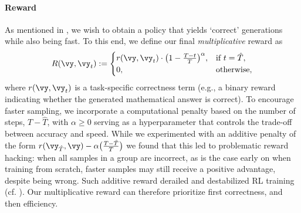 \paragraph{Reward} As mentioned in , we wish to obtain a policy that yields `correct' generations while also being fast. To this end, we define our final \emph{multiplicative} reward as
\begin{align}
\label{eq:reward}
        R(\vy, \vy_t) := \begin{cases}
        r(\vy, \vy_t) \cdot \big(1 - \frac{T - t}{T} \big)^{\alpha} , & \text{if } t = \hat{T}, \\
        0, & \text{otherwise,}
    \end{cases}
\end{align}
where $r(\vy, \vy_t)$ is a task-specific correctness term (e.g., a binary reward indicating whether the generated mathematical answer is correct). To encourage faster sampling, we incorporate a computational penalty based on the number of steps, $T - \hat{T}$, with $\alpha \ge 0$ serving as a hyperparameter that controls the trade-off between accuracy and speed. %
While we experimented with an additive penalty of the form $r(\vy_{\hat{T}
}, \vy)- \alpha \big(\frac{T - \hat{T}}{T} \big)$ \citep{graves2016adaptive} we found that this led to problematic reward hacking: when all samples in a group are incorrect, as is the case early on when training from scratch, faster samples may still receive a positive advantage, despite being wrong. Such additive reward derailed and destabilized RL training (cf. ). Our multiplicative reward can therefore prioritize first correctness, and then efficiency.
